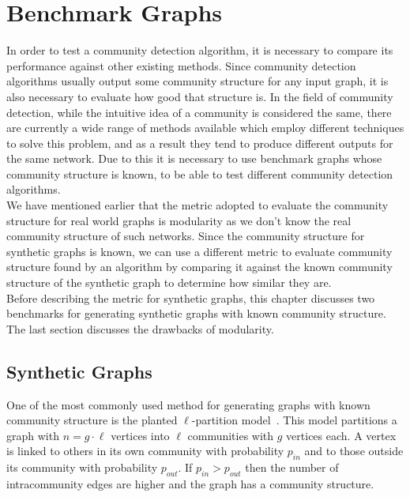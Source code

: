 \chapter{Benchmark Graphs}\label{bnch}
\pagestyle{myheadings}
\begin{spacing}{1.5}
In order to test a community detection algorithm, it is necessary to compare its performance against other existing methods. Since community detection algorithms usually output some community structure for any input graph, it is also necessary to evaluate how good that structure is. In the field of community detection, while the intuitive idea of a community is considered the same, there are currently a wide range of methods available which employ different techniques to solve this problem, and as a result they tend to produce different outputs for the same network. Due to this it is necessary to use benchmark graphs whose community structure is known, to be able to test different community detection algorithms.\\
\indent We have mentioned earlier that the metric adopted to evaluate the community structure for real world graphs is modularity as we don't know the real community structure of such networks. Since the community structure for synthetic graphs is known, we can use a different metric to evaluate community structure found by an algorithm by comparing it against the known community structure of the synthetic graph to determine how similar they are.\\
\indent Before describing the metric for synthetic graphs, this chapter discusses two benchmarks for generating synthetic graphs with known community structure. The last section discusses the drawbacks of modularity.
\section{Synthetic Graphs}
One of the most commonly used method for generating graphs with known community structure is the planted $\ell$-partition model~\cite{RSA:RSA1001}. This model partitions a graph with $n = g \cdot \ell$ vertices into $\ell$ communities with $g$ vertices each. A vertex is linked to others in its own community with probability $p_{in}$ and to those outside its community with probability $p_{out}$. If  $p_{in} > p_{out}$ then the number of intracommunity edges are higher and the graph has a community structure.

\end{spacing}
